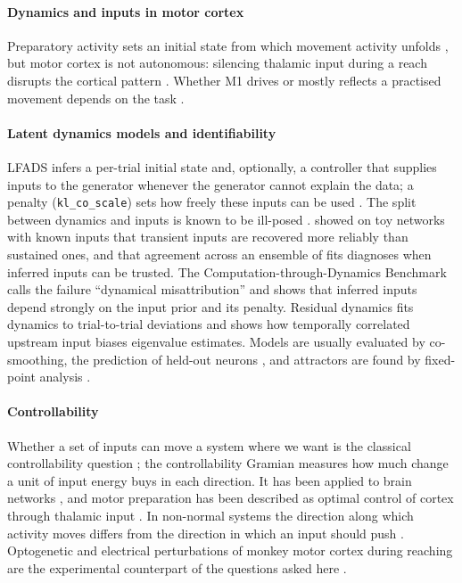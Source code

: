 \documentclass[11pt,a4paper]{article}
\newcommand{\kl}{\texttt{kl\_co\_scale}}
\begin{document}
\paragraph{Dynamics and inputs in motor cortex} Preparatory activity sets an initial state from which movement activity unfolds \citep{churchland2012,vyas2020}, but motor cortex is not autonomous: silencing thalamic input during a reach disrupts the cortical pattern \citep{sauerbrei2020}. Whether M1 drives or mostly reflects a practised movement depends on the task \citep{guo2015,kawai2015}.

\paragraph{Latent dynamics models and identifiability} LFADS infers a per-trial initial state and, optionally, a controller that supplies inputs to the generator whenever the generator cannot explain the data; a penalty (\kl) sets how freely these inputs can be used \citep{sussillo2016,pandarinath2018}. The split between dynamics and inputs is known to be ill-posed \citep{sussillo2016}. \citet{malonis2026} showed on toy networks with known inputs that transient inputs are recovered more reliably than sustained ones, and that agreement across an ensemble of fits diagnoses when inferred inputs can be trusted. The Computation-through-Dynamics Benchmark \citep{versteeg2025} calls the failure ``dynamical misattribution'' and shows that inferred inputs depend strongly on the input prior and its penalty. Residual dynamics \citep{galgali2023} fits dynamics to trial-to-trial deviations and shows how temporally correlated upstream input biases eigenvalue estimates. Models are usually evaluated by co-smoothing, the prediction of held-out neurons \citep{pei2021}, and attractors are found by fixed-point analysis \citep{sussillo2013}.

\paragraph{Controllability} Whether a set of inputs can move a system where we want is the classical controllability question \citep{kalman1960}; the controllability Gramian measures how much change a unit of input energy buys in each direction. It has been applied to brain networks \citep{gu2015}, and motor preparation has been described as optimal control of cortex through thalamic input \citep{kao2021}. In non-normal systems the direction along which activity moves differs from the direction in which an input should push \citep{goldman2009,murphy2009}. Optogenetic and electrical perturbations of monkey motor cortex during reaching are the experimental counterpart of the questions asked here \citep{oshea2022}.
\end{document}
